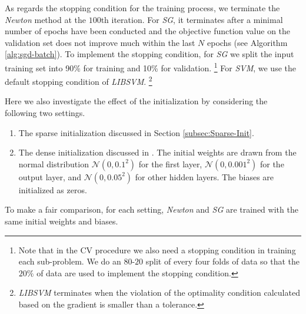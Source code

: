 \documentclass[12pt]{article}
\begin{document}
As regards the stopping condition for the training process, we terminate the {\sl Newton} method at the $100$th iteration. For {\sl SG}, it terminates after a minimal number of epochs have been conducted and the objective function value on the validation set does not improve much within the last $N$ epochs (see Algorithm \ref{alg:sgd-batch}). To implement the stopping condition, for {\sl SG} we split the input training set into 90\% for training and 10\% for validation.%
\footnote{Note that in the CV procedure we also need a stopping condition in training each sub-problem. We do an $80$-$20$ split of every four folds of data so that the $20\%$ of data are used to implement the stopping condition.} %
For {\sl SVM}, we use the default stopping condition of {\sl LIBSVM}.%
\footnote{
{\sl LIBSVM} terminates when the violation of the optimality condition calculated based on the gradient is smaller than a tolerance. 
}

\par Here we also investigate the effect of the initialization by considering the following two settings.
\begin{enumerate}[1.]
\item The sparse initialization discussed in Section \ref{subsec:Sparse-Init}.
\item The dense initialization discussed in \cite{PB14a}. The initial weights are drawn from the normal distribution $\mathcal{N}(0, 0.1^2)$ for the first layer, $\mathcal{N}(0, 0.001^2)$ for the output layer, and $\mathcal{N}(0, 0.05^2)$ for other hidden layers. The biases are initialized as zeros.
\end{enumerate}
To make a fair comparison, for each setting, {\sl Newton} and {\sl SG} are trained with the same initial weights and biases.
\end{document}

